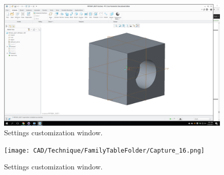 \begin{figure}[ht!]
\centering
  \includegraphics[width=0.7\linewidth]{CAD/Technique/FamilyTableFolder/Capture15.png}
  \caption{Settings customization window.}
  \label{fig:Mod_Ins_2}
\end{figure}

\begin{figure}[ht!]
\centering
  \texttt{[image: CAD/Technique/FamilyTableFolder/Capture\_16.png]}
  \caption{Settings customization window.}
  \label{fig:Mod_Ins_3}
\end{figure}


